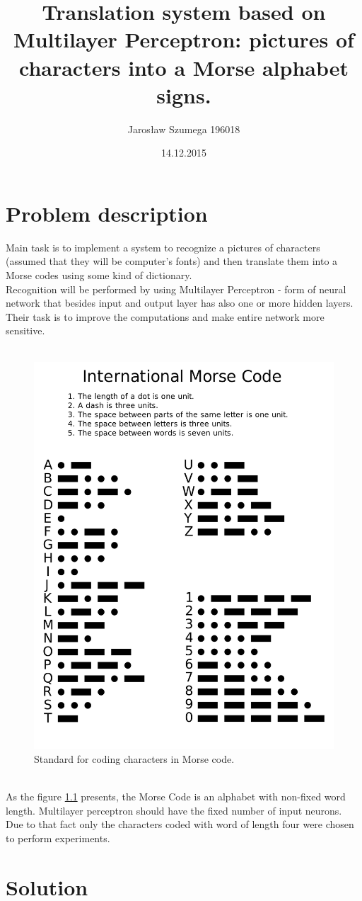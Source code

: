 \documentclass[eng,openany]{mgr}
\author{Jarosław Szumega 196018}
\title{Translation system based on Multilayer Perceptron: pictures of characters into a Morse alphabet signs.}
\date{14.12.2015}
\begin{document}
\maketitle
\tableofcontents
\chapter{Problem description}

Main task is to implement a system to recognize a pictures of characters (assumed that they will be computer's fonts) and then translate them into a Morse codes using some kind of dictionary.\\
Recognition will be performed by using Multilayer Perceptron - form of neural network that besides input and output layer has also one or more hidden layers. Their task is to improve the computations and make entire network more sensitive.
\\\\
\begin{figure}[h]
\centering
\includegraphics[width=0.5\linewidth]{./morse}
\caption{Standard for coding characters in Morse code.}
\label{fig:morse}
\end{figure}
\\
As the figure \ref{fig:morse} presents, the Morse Code is an alphabet with non-fixed word length. Multilayer perceptron should have the fixed number of input neurons. Due to that fact only the characters coded with word of length four were chosen to perform experiments.
\chapter{Solution}
\end{document}
